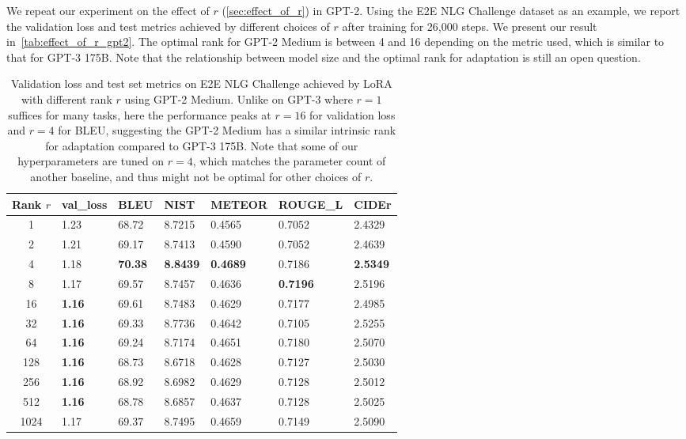 We repeat our experiment on the effect of $r$ (\autoref{sec:effect_of_r}) in GPT-2.
Using the E2E NLG Challenge dataset as an example, we report the validation loss and test metrics achieved by different choices of $r$ after training for 26,000 steps.
We present our result in~\autoref{tab:effect_of_r_gpt2}.
The optimal rank for GPT-2 Medium is between 4 and 16 depending on the metric used, which is similar to that for GPT-3 175B.
Note that the relationship between model size and the optimal rank for adaptation is still an open question.

\begin{table}[h]
  \centering
  \begin{tabular}{c|llllll}
  \toprule
Rank $r$& val\_loss     & BLEU            & NIST            & METEOR          & ROUGE\_L        & CIDEr           \\
\midrule
1    & 1.23          & 68.72          & 8.7215          & 0.4565          & 0.7052          & 2.4329          \\
2    & 1.21          & 69.17          & 8.7413          & 0.4590          & 0.7052          & 2.4639          \\
4    & 1.18          & \textbf{70.38} & \textbf{8.8439} & \textbf{0.4689} & 0.7186          & \textbf{2.5349} \\
8    & 1.17          & 69.57          & 8.7457          & 0.4636          & \textbf{0.7196} & 2.5196          \\
16   & \textbf{1.16} & 69.61          & 8.7483          & 0.4629          & 0.7177          & 2.4985          \\
32   & \textbf{1.16} & 69.33          & 8.7736          & 0.4642          & 0.7105          & 2.5255          \\
64   & \textbf{1.16} & 69.24          & 8.7174          & 0.4651          & 0.7180          & 2.5070          \\
128  & \textbf{1.16} & 68.73          & 8.6718          & 0.4628          & 0.7127          & 2.5030          \\
256  & \textbf{1.16} & 68.92          & 8.6982          & 0.4629          & 0.7128          & 2.5012          \\
512  & \textbf{1.16} & 68.78          & 8.6857          & 0.4637          & 0.7128          & 2.5025          \\
1024 & 1.17          & 69.37          & 8.7495          & 0.4659          & 0.7149          & 2.5090          \\
  \bottomrule
  \end{tabular}
  \caption{Validation loss and test set metrics on E2E NLG Challenge achieved by LoRA with different rank $r$ using GPT-2 Medium. Unlike on GPT-3 where $r=1$ suffices for many tasks, here the performance peaks at $r=16$ for validation loss and $r=4$ for BLEU, suggesting the GPT-2 Medium has a similar intrinsic rank for adaptation compared to GPT-3 175B. Note that some of our hyperparameters are tuned on $r=4$, which matches the parameter count of another baseline, and thus might not be optimal for other choices of $r$.}
  \label{tab:effect_of_r_gpt2}
\end{table}

